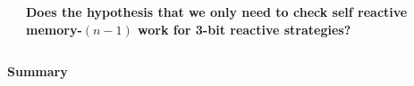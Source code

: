 \documentclass{beamer}
\def\checkmark{\tikz\fill[scale=0.4](0,.35) -- (.25,0) -- (1,.7) -- (.25,.15) -- cycle;}
\begin{document}


\begin{frame}
    \begin{center}
        \begin{columns}
            \centering
            \begin{column}{.5\textwidth}
            \centering
        
            \end{column}
        \begin{column}{.5\textwidth}
            \centering
            \textbf{Does the hypothesis that we only need to check self reactive memory-$(n -1)$
            work for 3-bit reactive strategies?}
        \end{column}
    \end{columns}
    \end{center}
\end{frame}

\begin{frame}
    \centering
    \textbf{\Large{Summary}}
    \vspace{1cm}

    \begin{columns}
        \centering
        \begin{column}{.5\textwidth}
        \centering
    
        \end{column}
    \pause 
        \begin{column}{.5\textwidth}
            \centering
        
            \end{column}
\end{columns}

\end{frame}
\end{document}
